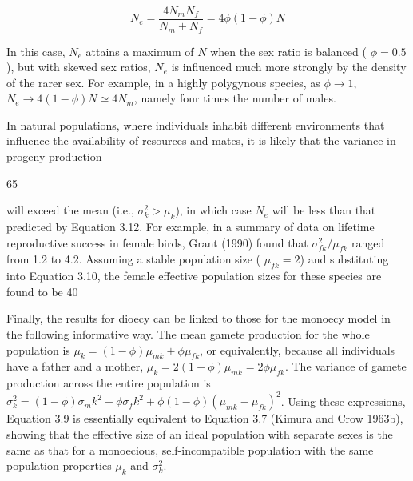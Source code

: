 \documentclass{article}
\begin{document}
\begin{equation}
N_{e}=\frac{4N_{m}N_{f}}{N_{m}+N_{f}}=4\phi(1-\phi)N
\tag{3.12}
\label{eq:3_12}
\end{equation}

In this case,  $ N_e $ attains a maximum of  $ N $ when the sex ratio is balanced ( $ \phi = 0.5 $), but with skewed sex ratios,  $ N_e $ is influenced much more strongly by the density of the rarer sex. For example, in a highly polygynous species, as  $ \phi \to 1 $,  $ N_e \to 4(1 - \phi)N \simeq 4N_m $, namely four times the number of males.

In natural populations, where individuals inhabit different environments that influence the availability of resources and mates, it is likely that the variance in progeny production

65

will exceed the mean (i.e.,  $ \sigma_k^2 > \mu_k $), in which case  $ N_e $ will be less than that predicted by Equation 3.12. For example, in a summary of data on lifetime reproductive success in female birds, Grant (1990) found that  $ \sigma_{fk}^2 / \mu_{fk} $ ranged from 1.2 to 4.2. Assuming a stable population size ( $ \mu_{fk} = 2 $) and substituting into Equation 3.10, the female effective population sizes for these species are found to be 40%

Finally, the results for dioecy can be linked to those for the monoecy model in the following informative way. The mean gamete production for the whole population is  $ \mu_k = (1 - \phi)\mu_{mk} + \phi\mu_{fk} $, or equivalently, because all individuals have a father and a mother,  $ \mu_k = 2(1 - \phi)\mu_{mk} = 2\phi\mu_{fk} $. The variance of gamete production across the entire population is  $ \sigma_k^2 = (1 - \phi)\sigma_mk^2 + \phi\sigma_fk^2 + \phi(1 - \phi)(\mu_{mk} - \mu_{fk})^2 $. Using these expressions, Equation 3.9 is essentially equivalent to Equation 3.7 (Kimura and Crow 1963b), showing that the effective size of an ideal population with separate sexes is the same as that for a monoecious, self-incompatible population with the same population properties  $ \mu_k $ and  $ \sigma_k^2 $.
\end{document}
